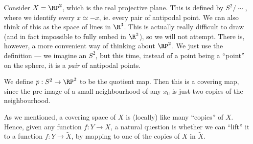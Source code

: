\documentclass[a4paper]{article}
\begin{document}
\begin{eg}
  Consider $X = \RP^2$, which is the real projective plane. This is defined by $S^2/{\sim}$, where we identify every $x\simeq -x$, ie. every pair of antipodal point. We can also think of this as the space of lines in $\R^3$. This is actually really difficult to draw (and in fact impossible to fully embed in $\R^3$), so we will not attempt. There is, however, a more convenient way of thinking about $\RP^2$. We just use the definition --- we imagine an $S^2$, but this time, instead of a point being a ``point'' on the sphere, it is a \emph{pair} of antipodal points.
  \begin{center}
  \end{center}
  We define $p: S^2 \to \RP^2$ to be the quotient map. Then this is a covering map, since the pre-image of a small neighbourhood of any $x_0$ is just two copies of the neighbourhood.
\end{eg}

As we mentioned, a covering space of $X$ is (locally) like many ``copies'' of $X$. Hence, given any function $f: Y \to X$, a natural question is whether we can ``lift'' it to a function $f: Y \to \tilde{X}$, by mapping to one of the copies of $X$ in $\tilde{X}$.
\end{document}
